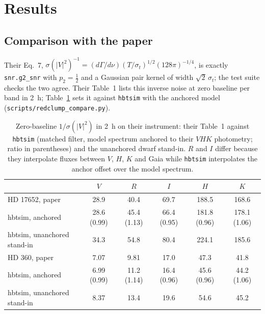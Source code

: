 \documentclass[11pt]{article}
\begin{document}
\section{Results}

\subsection{Comparison with the paper}

Their Eq.~7, $\sigma(|V|^2)^{-1} = (d\Gamma/d\nu)(T/\sigma_t)^{1/2}
(128\pi)^{-1/4}$, is exactly \texttt{snr.g2\_snr} with $p_2 =
\tfrac12$ and a Gaussian pair kernel of width $\sqrt2\,\sigma_t$; the
test suite checks the two agree. Their Table~1 lists this inverse noise
at zero baseline per band in 2~h; Table~\ref{tab:t1} sets it against
\texttt{hbtsim} with the anchored model
(\texttt{scripts/redclump\_compare.py}).

\begin{table}[h]
\centering
\caption{Zero-baseline $1/\sigma(|V|^2)$ in 2~h on their instrument:
their Table~1 against \texttt{hbtsim} (matched filter, model spectrum
anchored to their $V H K$ photometry; ratio in parentheses) and the
unanchored dwarf stand-in. $R$ and $I$ differ because they interpolate
fluxes between $V$, $H$, $K$ and Gaia while \texttt{hbtsim} interpolates
the anchor offset over the model spectrum.}
\small
\begin{tabular}{lccccc}
\toprule
& $V$ & $R$ & $I$ & $H$ & $K$ \\
\midrule
HD 17652, paper & 28.9 & 40.4 & 69.7 & 188.5 & 168.6 \\
\quad hbtsim, anchored & 28.6 (0.99) & 45.4 (1.13) & 66.4 (0.95) & 181.8 (0.96) & 178.1 (1.06) \\
\quad hbtsim, unanchored stand-in & 34.3 & 54.8 & 80.4 & 224.1 & 185.6 \\
HD 360, paper & 7.07 & 9.81 & 17.0 & 47.3 & 41.8 \\
\quad hbtsim, anchored & 6.99 (0.99) & 11.2 (1.14) & 16.4 (0.96) & 45.6 (0.96) & 44.2 (1.06) \\
\quad hbtsim, unanchored stand-in & 8.37 & 13.4 & 19.6 & 54.6 & 45.2 \\
\bottomrule
\end{tabular}
\label{tab:t1}
\end{table}
\end{document}
